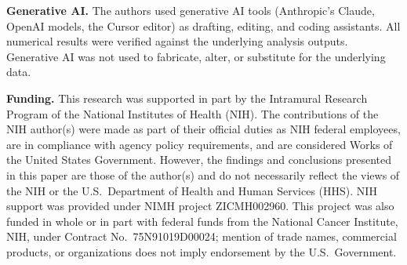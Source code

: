 \documentclass{article}
\begin{document}
\begin{poster}
{        \textbf{Generative AI.} The authors used generative AI tools (Anthropic's Claude, OpenAI models, the Cursor editor) as drafting, editing, and coding assistants. All numerical results were verified against the underlying analysis outputs. Generative AI was not used to fabricate, alter, or substitute for the underlying data.
        \smallskip

        \textbf{Funding.} This research was supported in part by the Intramural Research Program of the National Institutes of Health (NIH). The contributions of the NIH author(s) were made as part of their official duties as NIH federal employees, are in compliance with agency policy requirements, and are considered Works of the United States Government. However, the findings and conclusions presented in this paper are those of the author(s) and do not necessarily reflect the views of the NIH or the U.S.\ Department of Health and Human Services (HHS). NIH support was provided under NIMH project ZICMH002960. This project was also funded in whole or in part with federal funds from the National Cancer Institute, NIH, under Contract No.\ 75N91019D00024; mention of trade names, commercial products, or organizations does not imply endorsement by the U.S.\ Government.\par
    }

\end{poster}
\end{document}
